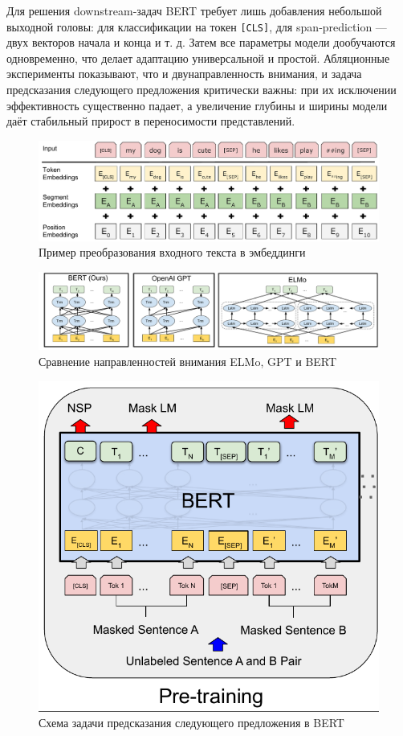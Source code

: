 \documentclass[14pt,a4paper,oneside,openany]{extbook}
\begin{document}
Для решения downstream‐задач BERT требует лишь добавления небольшой выходной головы: для классификации на токен \texttt{[CLS]}, для span‐prediction — двух векторов начала и конца и т. д. Затем все параметры модели дообучаются одновременно, что делает адаптацию универсальной и простой. Абляционные эксперименты показывают, что и двунаправленность внимания, и задача предсказания следующего предложения критически важны: при их исключении эффективность существенно падает, а увеличение глубины и ширины модели даёт стабильный прирост в переносимости представлений.

\begin{figure}[h]
\centering
\includegraphics[width=.9\linewidth]{img/Input_Emebeddings.pdf}
\caption{\label{fig:inputemebeddings}Пример преобразования входного текста в эмбеддинги}
\end{figure}

\begin{figure}[h]
\centering
\includegraphics[width=.9\linewidth]{img/BERT_comparisons.pdf}
\caption{\label{fig:BERT_comparisons}Сравнение направленностей внимания ELMo, GPT и BERT}
\end{figure}

\begin{figure}[h]
\centering
\includegraphics[width=.6\textwidth]{img/bert_pretrainin.png}
\caption{\label{fig:bert_pretrainin}Схема задачи предсказания следующего предложения в BERT}
\end{figure}
\end{document}
